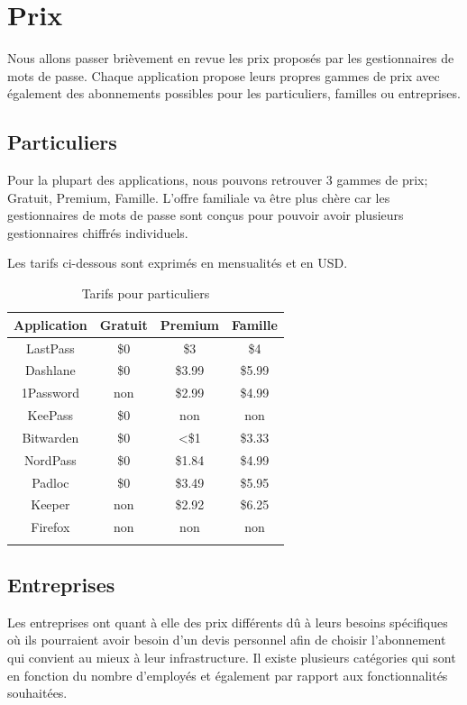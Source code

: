 \section{Prix}
Nous allons passer brièvement en revue les prix proposés par les gestionnaires de mots de passe. Chaque application propose leurs propres gammes de prix avec également des abonnements possibles pour les particuliers, familles ou entreprises. 
\subsection{Particuliers}
Pour la plupart des applications, nous pouvons retrouver 3 gammes de prix; Gratuit, Premium, Famille. L'offre familiale va être plus chère car les gestionnaires de mots de passe sont conçus pour pouvoir avoir plusieurs gestionnaires chiffrés individuels. 

Les tarifs ci-dessous sont exprimés en mensualités et en USD. \\
\begin{longtable}[h]{|c|c|c|c|}
		\hline
	Application & Gratuit & Premium & Famille \\
		\hline
	LastPass & \$0 & \$3 & \$4  \\
		\hline
	Dashlane & \$0 & \$3.99 & \$5.99 \\
		\hline
	1Password & non & \$2.99 & \$4.99  \\
		\hline
	KeePass & \$0 & non & non   \\
		\hline
	Bitwarden & \$0 & <\$1 & \$3.33   \\
		\hline
	NordPass & \$0 & \$1.84 & \$4.99  \\
	\hline
	Padloc & \$0 & \$3.49 & \$5.95    \\
	\hline
	Keeper & non & \$2.92 & \$6.25  \\
	\hline
	Firefox & non & non & non  \\
	\hline
\caption{Tarifs pour particuliers}
\end{longtable}
\subsection{Entreprises}
Les entreprises ont quant à elle des prix différents dû à leurs besoins spécifiques où ils pourraient avoir besoin d'un devis personnel afin de choisir l'abonnement qui convient au mieux à leur infrastructure. Il existe plusieurs catégories qui sont en fonction du nombre d'employés et également par rapport aux fonctionnalités souhaitées. 

